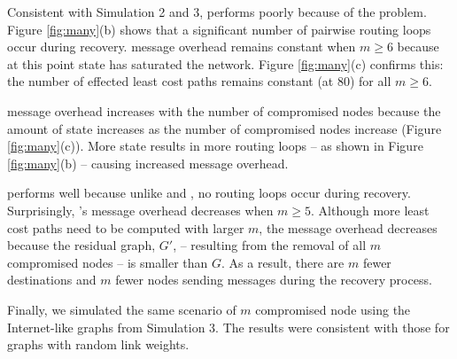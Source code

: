 Consistent with Simulation 2 and 3, \second performs poorly because of the \infinity problem. 
Figure \ref{fig:many}(b) shows that a significant number of pairwise routing loops occur during \second recovery.  
\second message overhead remains constant when $m \geq 6$ because at this point \badvector state has saturated the network.  
Figure \ref{fig:many}(c) confirms this: the number of effected least cost paths remains constant (at $80$) for 
all $m \geq 6$. 


\cpr message overhead increases with the number of compromised nodes because the amount of \oldvector state increases as the number of compromised nodes increase (Figure \ref{fig:many}(c)). 
More \oldvector state results in more routing loops -- as shown in Figure \ref{fig:many}(b) -- causing increased message overhead.

\purge performs well because unlike \cpr and \seconds, no routing loops occur during recovery. %
Surprisingly, \purges's message overhead decreases when $m \geq 5$.  Although more 
least cost paths need to be computed with larger $m$, the message overhead decreases because the residual graph, $G'$, -- resulting from the removal of all $m$ compromised nodes -- is 
smaller than $G$.  As a result, there are $m$ fewer destinations and $m$ fewer nodes sending messages during the recovery process.

Finally, we simulated the same scenario of $m$ compromised node using the Internet-like graphs from Simulation 3. 
The results were consistent with those for \er graphs with random link weights. %




